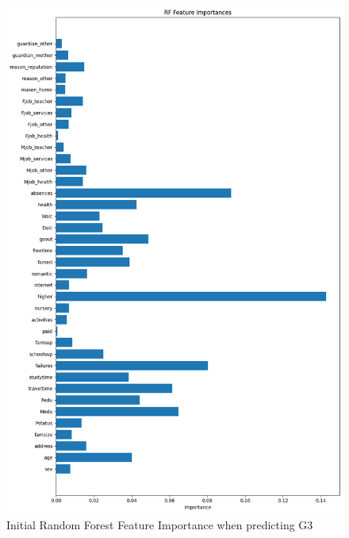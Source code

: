 \documentclass[11pt,a4paper]{article}
\begin{document}
\begin{figure} [H]
\centering %
\includegraphics[width=13cm]{init_rf_featimp.png}
\caption{Initial Random Forest Feature Importance when predicting G3}
\label{fig:initrffeatureimportance}
\end{figure}
\end{document}

